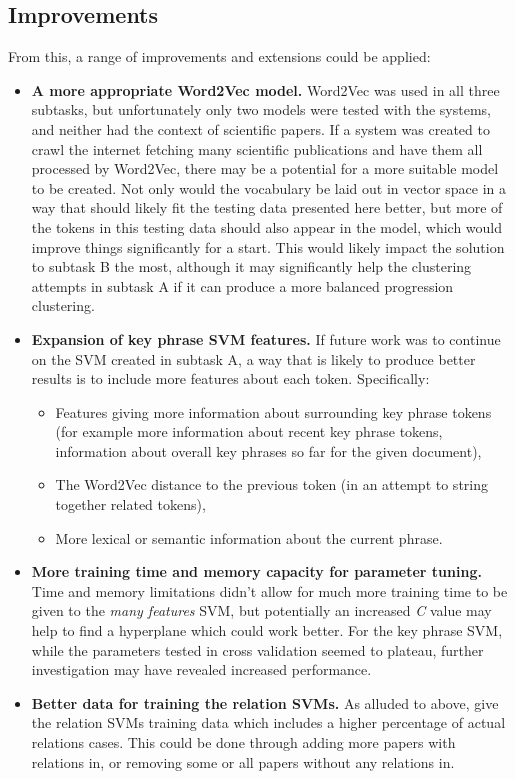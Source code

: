 \subsection{Improvements}
From this, a range of improvements and extensions could be applied:
\begin{itemize}
	\item \textbf{A more appropriate Word2Vec model.} Word2Vec was used in all three subtasks, but unfortunately only two models were tested with the systems, and neither had the context of scientific papers. If a system was created to crawl the internet fetching many scientific publications and have them all processed by Word2Vec, there may be a potential for a more suitable model to be created. Not only would the vocabulary be laid out in vector space in a way that should likely fit the testing data presented here better, but more of the tokens in this testing data should also appear in the model, which would improve things significantly for a start. This would likely impact the solution to subtask B the most, although it may significantly help the clustering attempts in subtask A if it can produce a more balanced progression clustering.
	\item \textbf{Expansion of key phrase SVM features.} If future work was to continue on the SVM created in subtask A, a way that is likely to produce better results is to include more features about each token. Specifically:
	\begin{itemize}
		\item Features giving more information about surrounding key phrase tokens (for example more information about recent key phrase tokens, information about overall key phrases so far for the given document),
		\item The Word2Vec distance to the previous token (in an attempt to string together related tokens),
		\item More lexical or semantic information about the current phrase.
	\end{itemize}
	\item \textbf{More training time and memory capacity for parameter tuning.} Time and memory limitations didn't allow for much more training time to be given to the \textit{many features} SVM, but potentially an increased \textit{C} value may help to find a hyperplane which could work better. For the key phrase SVM, while the parameters tested in cross validation seemed to plateau, further investigation may have revealed increased performance.
	\item \textbf{Better data for training the relation SVMs.} As alluded to above, give the relation SVMs training data which includes a higher percentage of actual relations cases. This could be done through adding more papers with relations in, or removing some or all papers without any relations in.

\end{itemize}
